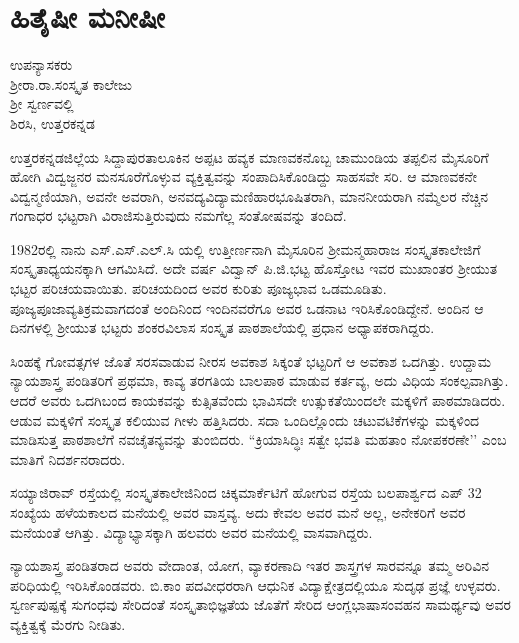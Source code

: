 {\fontsize{14}{16}\selectfont
\chapter{ಹಿತೈಷೀ  \enginline{-}  ಮನೀಷೀ}

\begin{center}
\smallskip

ಉಪನ್ಯಾಸಕರು\\ 
ಶ್ರೀರಾ.ರಾ.ಸಂಸ್ಕೃತ ಕಾಲೇಜು\\
ಶ್ರೀ ಸ್ವರ್ಣವಲ್ಲಿ\\
ಶಿರಸಿ, ಉತ್ತರಕನ್ನಡ
\addrule
\end{center}

ಉತ್ತರಕನ್ನಡಜಿಲ್ಲೆಯ ಸಿದ್ದಾಪುರತಾಲೂಕಿನ ಅಪ್ಪಟ ಹವ್ಯಕ ಮಾಣವಕನೊಬ್ಬ ಚಾಮುಂಡಿಯ ತಪ್ಪಲಿನ ಮೈಸೂರಿಗೆ ಹೋಗಿ ವಿದ್ವಜ್ಜನರ ಮನಸೂರೆಗೊಳ್ಳುವ ವ್ಯಕ್ತಿತ್ವವನ್ನು ಸಂಪಾದಿಸಿಕೊಂಡಿದ್ದು ಸಾಹಸವೇ ಸರಿ. ಆ ಮಾಣವಕನೇ ವಿದ್ವನ್ಮಣಿಯಾಗಿ, ಅವನೇ ಅವರಾಗಿ, ಅನವದ್ಯವಿದ್ಯಾಮಣಿಹಾರಭೂಷಿತರಾಗಿ, ಮಾನನೀಯರಾಗಿ ನಮ್ಮೆಲರ ನೆಚ್ಚಿನ ಗಂಗಾಧರ ಭಟ್ಟರಾಗಿ ವಿರಾಜಿಸುತ್ತಿರುವುದು ನಮಗೆಲ್ಲ ಸಂತೋಷವನ್ನು ತಂದಿದೆ.

1982ರಲ್ಲಿ ನಾನು  ಎಸ್.ಎಸ್.ಎಲ್.ಸಿ ಯಲ್ಲಿ ಉತ್ತೀರ್ಣನಾಗಿ ಮೈಸೂರಿನ ಶ್ರೀಮನ್ಮಹಾರಾಜ ಸಂಸ್ಕೃತಕಾಲೇಜಿಗೆ ಸಂಸ್ಕೃತಾಧ್ಯಯನಕ್ಕಾಗಿ ಆಗಮಿಸಿದೆ. ಅದೇ ವರ್ಷ ವಿದ್ವಾನ್ ಪಿ.ಜಿ.ಭಟ್ಟ ಹೊಸ್ತೋಟ ಇವರ ಮುಖಾಂತರ ಶ್ರೀಯುತ ಭಟ್ಟರ ಪರಿಚಯವಾಯಿತು. ಪರಿಚಯದಿಂದ ಅವರ ಕುರಿತು ಪೂಜ್ಯಭಾವ ಒಡಮೂಡಿತು. ಪೂಜ್ಯಪೂಜಾವ್ಯತಿಕ್ರಮವಾಗದಂತೆ ಅಂದಿನಿಂದ ಇಂದಿನವರೆಗೂ ಅವರ ಒಡನಾಟ ಇರಿಸಿಕೊಂಡಿದ್ದೇನೆ. ಅಂದಿನ ಆ ದಿನಗಳಲ್ಲಿ ಶ್ರೀಯುತ ಭಟ್ಟರು ಶಂಕರವಿಲಾಸ ಸಂಸ್ಕೃತ ಪಾಠಶಾಲೆಯಲ್ಲಿ ಪ್ರಧಾನ ಅಧ್ಯಾಪಕರಾಗಿದ್ದರು.

ಸಿಂಹಕ್ಕೆ ಗೋವತ್ಸಗಳ ಜೊತೆ ಸರಸವಾಡುವ ನೀರಸ ಅವಕಾಶ ಸಿಕ್ಕಂತೆ ಭಟ್ಟರಿಗೆ ಆ ಅವಕಾಶ ಒದಗಿತ್ತು. ಉದ್ದಾಮ ನ್ಯಾಯಶಾಸ್ತ್ರ ಪಂಡಿತರಿಗೆ ಪ್ರಥಮಾ, ಕಾವ್ಯ ತರಗತಿಯ ಬಾಲಪಾಠ ಮಾಡುವ ಕರ್ತವ್ಯ, ಅದು ವಿಧಿಯ ಸಂಕಲ್ಪವಾಗಿತ್ತು.  ಆದರೆ ಅವರು ಒದಗಿಬಂದ ಕಾಯಕವನ್ನು ಕುತ್ಸಿತವೆಂದು ಭಾವಿಸದೇ  ಉತ್ಸುಕತೆಯಿಂದಲೇ ಮಕ್ಕಳಿಗೆ ಪಾಠಮಾಡಿದರು. ಆಡುವ ಮಕ್ಕಳಿಗೆ ಸಂಸ್ಕೃತ ಕಲಿಯುವ ಗೀಳು ಹತ್ತಿಸಿದರು. ಸದಾ ಒಂದಿಲ್ಲೊಂದು ಚಟುವಟಿಕೆಗಳನ್ನು ಮಕ್ಕಳಿಂದ ಮಾಡಿಸುತ್ತ ಪಾಠಶಾಲೆಗೆ ನವಚೈತನ್ಯವನ್ನು ತುಂಬಿದರು. “ಕ್ರಿಯಾಸಿದ್ಧಿಃ ಸತ್ವೇ ಭವತಿ ಮಹತಾಂ ನೋಪಕರಣೇ’’ ಎಂಬ ಮಾತಿಗೆ ನಿದರ್ಶನರಾದರು.

ಸಯ್ಯಾಜಿರಾವ್ ರಸ್ತೆಯಲ್ಲಿ ಸಂಸ್ಕೃತಕಾಲೇಜಿನಿಂದ ಚಿಕ್ಕಮಾರ್ಕೆಟಿಗೆ ಹೋಗುವ ರಸ್ತೆಯ ಬಲಪಾರ್ಶ್ವದ   \enginline{-}   ಎಪ್   \enginline{-}   32 ಸಂಖ್ಯೆಯ ಹಳೆಯಕಾಲದ ಮನೆಯಲ್ಲಿ ಅವರ ವಾಸ್ತವ್ಯ. ಅದು ಕೇವಲ ಅವರ ಮನೆ ಅಲ್ಲ, ಅನೇಕರಿಗೆ ಅವರ ಮನೆಯಂತೆ ಆಗಿತ್ತು. ವಿದ್ಯಾಭ್ಯಾಸಕ್ಕಾಗಿ ಹಲವರು ಅವರ ಮನೆಯಲ್ಲಿ ವಾಸವಾಗಿದ್ದರು.

ನ್ಯಾಯಶಾಸ್ತ್ರ ಪಂಡಿತರಾದ ಅವರು ವೇದಾಂತ, ಯೋಗ, ವ್ಯಾಕರಣಾದಿ ಇತರ ಶಾಸ್ತ್ರಗಳ ಸಾರವನ್ನೂ ತಮ್ಮ ಅರಿವಿನ ಪರಿಧಿಯಲ್ಲಿ ಇರಿಸಿಕೊಂಡವರು. ಬಿ.ಕಾಂ ಪದವೀಧರರಾಗಿ ಆಧುನಿಕ ವಿದ್ಯಾಕ್ಷೇತ್ರದಲ್ಲಿಯೂ ಸುದೃಢ ಪ್ರಜ್ಞೆ ಉಳ್ಳವರು. ಸ್ವರ್ಣಪುಷ್ಪಕ್ಕೆ ಸುಗಂಧವು ಸೇರಿದಂತೆ ಸಂಸ್ಕೃತಾಭಿಜ್ಞತೆಯ ಜೊತೆಗೆ ಸೇರಿದ ಆಂಗ್ಲಭಾಷಾಸಂವಹನ ಸಾಮರ್ಥ್ಯವು ಅವರ ವ್ಯಕ್ತಿತ್ವಕ್ಕೆ ಮೆರಗು ನೀಡಿತು. 

}
